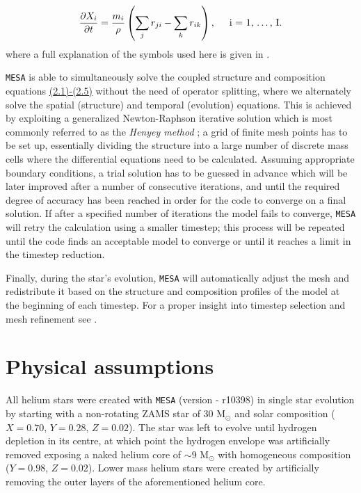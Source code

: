 \documentclass[../../main/thesis_msc.tex]{subfiles}
\begin{document}
    			\begin{eqnarray}
    				\frac{\partial X_i}{\partial t} = \frac{m_i}{\rho} \left( \sum_j r_{ji} - \sum_k r_{ik} \right), \hspace{0.5cm} \text{i = 1, $\dots$, I.} \label{eq:2.5}
    			\end{eqnarray}
    			where a full explanation of the symbols used here is given in \cite[][p. 89]{Kipp_book}. 
    			
    			\texttt{MESA} is able to simultaneously solve the coupled structure and composition equations \hyperref[eq:2.1]{(2.1)-(2.5)} without the need of operator splitting, where we alternately solve the spatial (structure) and temporal (evolution) equations. This is achieved by exploiting a generalized Newton-Raphson iterative solution which is most commonly referred to as the \emph{Henyey method} \citep[][p. 106]{Wilson1981, Kipp_book}; a grid of finite mesh points has to be set up, essentially dividing the structure into a large number of discrete mass cells where the differential equations need to be calculated. Assuming appropriate boundary conditions, a trial solution has to be guessed in advance which will be later improved after a number of consecutive iterations, and until the required degree of accuracy has been reached in order for the code to converge on a final solution. If after a specified number of iterations the model fails to converge, \texttt{MESA} will retry the calculation using a smaller timestep; this process will be repeated until the code finds an acceptable model to converge or until it reaches a limit in the timestep reduction.
    			
    			Finally, during the star's evolution, \texttt{MESA} will automatically adjust the mesh and redistribute it based on the structure and composition profiles of the model at the beginning of each timestep. For a proper insight into timestep selection and mesh refinement see \cite{Paxton2011}.
    			
    		\section{Physical assumptions}
    		
    			All helium stars were created with \texttt{MESA} (version - r10398) in single star evolution by starting with a non-rotating ZAMS star of $30$ M$_{\odot}$ and solar composition ($X = 0.70$, $Y = 0.28$, $Z = 0.02$). The star was left to evolve until hydrogen depletion in its centre, at which point the hydrogen envelope was artificially removed exposing a naked helium core of $\sim 9$ M$_{\odot}$ with homogeneous composition ($Y = 0.98$, $Z = 0.02$). Lower mass helium stars were created by artificially removing the outer layers of the aforementioned helium core.
    			
\end{document}
